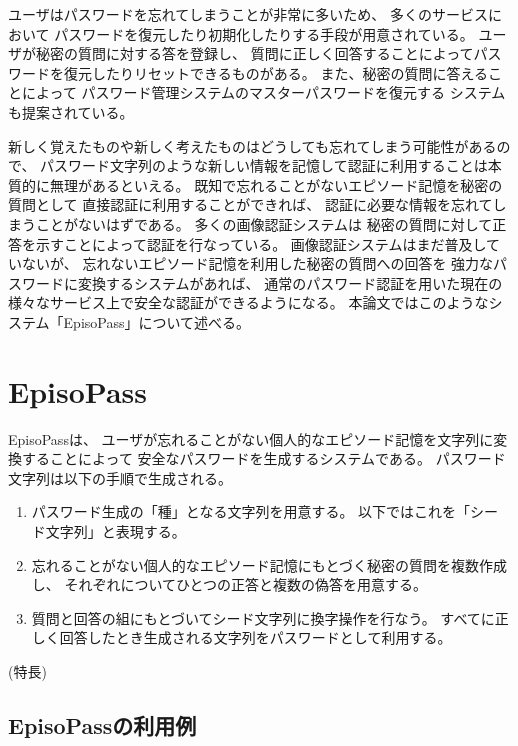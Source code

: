 \documentclass[twoside]{wiss}
\begin{document}
ユーザはパスワードを忘れてしまうことが非常に多いため、
多くのサービスにおいて
パスワードを復元したり初期化したりする手段が用意されている。
ユーザが秘密の質問に対する答を登録し、
質問に正しく回答することによってパスワードを復元したりリセットできるものがある。
また、秘密の質問に答えることによって
パスワード管理システムのマスターパスワードを復元する
システム\cite{平野亮:2011-11-07}も提案されている。

新しく覚えたものや新しく考えたものはどうしても忘れてしまう可能性があるので、
パスワード文字列のような新しい情報を記憶して認証に利用することは本質的に無理があるといえる。
既知で忘れることがないエピソード記憶を秘密の質問として
直接認証に利用することができれば、
認証に必要な情報を忘れてしまうことがないはずである。
多くの画像認証システム\cite{小池英樹:2006-05-15}は
秘密の質問に対して正答を示すことによって認証を行なっている。
%
画像認証システムはまだ普及していないが、
忘れないエピソード記憶を利用した秘密の質問への回答を
強力なパスワードに変換するシステムがあれば、
通常のパスワード認証を用いた現在の様々なサービス上で安全な認証ができるようになる。
本論文ではこのようなシステム「EpisoPass」について述べる。

\section{EpisoPass}

EpisoPassは、
ユーザが忘れることがない個人的なエピソード記憶を文字列に変換することによって
安全なパスワードを生成するシステムである。
パスワード文字列は以下の手順で生成される。

\begin{enumerate}
\item パスワード生成の「種」となる文字列を用意する。
以下ではこれを「シード文字列」と表現する。
\item 忘れることがない個人的なエピソード記憶にもとづく秘密の質問を複数作成し、
それぞれについてひとつの正答と複数の偽答を用意する。
\item 質問と回答の組にもとづいてシード文字列に換字操作を行なう。
すべてに正しく回答したとき生成される文字列をパスワードとして利用する。
\end{enumerate}

(特長)

\subsection{EpisoPassの利用例}
\end{document}
